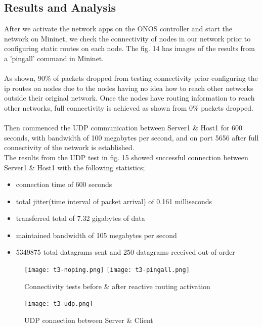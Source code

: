 \documentclass{article}
\begin{document}
\subsection{Results and Analysis}
After we activate the network apps on the ONOS controller and start the network on Mininet, we check the connectivity of nodes in our network prior to configuring static routes on each node. The fig. 14 has images of the results from a 'pingall' command in Mininet. \\\\ As shown, 90\% of packets dropped from testing connectivity prior configuring the ip routes on nodes due to the nodes having no idea how to reach other networks outside their original network. Once the nodes have routing information to reach other networks, full connectivity is achieved as shown from 0\% packets dropped. \\\\  Then commenced the UDP communication between Server1 \& Host1 for 600 seconds, with bandwidth of 100 megabytes per second, and on port 5656 after full connectivity of the network is established. \\ The results from the UDP test in fig. 15 showed successful connection between Server1 \& Host1 with the following statistics;
	\begin{itemize}
		\item connection time of 600 seconds
		\item total jitter(time interval of packet arrival) of 0.161 milliseconds
		\item transferred total of 7.32 gigabytes of data
		\item maintained bandwidth of 105 megabytes per second
		\item 5349875 total datagrams sent and 250 datagrams received out-of-order
	\end{itemize}
\begin{center}
  	\begin{figure}[h]
			\centering
			\texttt{[image: t3-noping.png]}
		\endminipage{} 
			\centering
			\texttt{[image: t3-pingall.png]}
		\endminipage{}
            	\caption{Connectivity tests before \& after reactive routing activation}
            	\label{fig:t3-2}
        \end{figure} 
	\vspace{10pt}
        \begin{figure}[h]
        		\centering
		\texttt{[image: t3-udp.png]}
		\caption{UDP connection between Server \& Client}
		\label{fig:t3-3}
        \end{figure}
\end{center}
\end{document}
